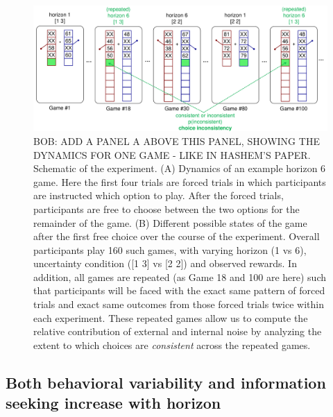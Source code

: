 \documentclass[12pt]{article}
\begin{document}
	\begin{figure}[hp]
		\begin{center}
			\includegraphics[width=\textwidth]{figures/taskfiga.pdf}
			\caption{BOB: ADD A PANEL A ABOVE THIS PANEL, SHOWING THE DYNAMICS FOR ONE GAME - LIKE IN HASHEM'S PAPER.  
			Schematic of the experiment. (A) Dynamics of an example horizon 6 game.  Here the first four trials are forced trials in which participants are instructed which option to play.  After the forced trials, participants are free to choose between the two options for the remainder of the game.  (B) Different possible states of the game after the first free choice over the course of the experiment. Overall participants play 160 such games, with varying horizon (1 vs 6), uncertainty condition ([1 3] vs [2 2]) and observed rewards.  In addition, all games are repeated (as Game 18 and 100 are here) such that participants will be faced with the exact same pattern of forced trials and exact same outcomes from those forced trials twice within each experiment.  These repeated games allow us to compute the relative contribution of external and internal noise by analyzing the extent to which choices are {\em consistent} across the repeated games.}%
			\label{fig:taskfig}
		\end{center}
	\end{figure}
	
	\subsection*{Both behavioral variability and information seeking increase with horizon}
	
	
	
\end{document}
